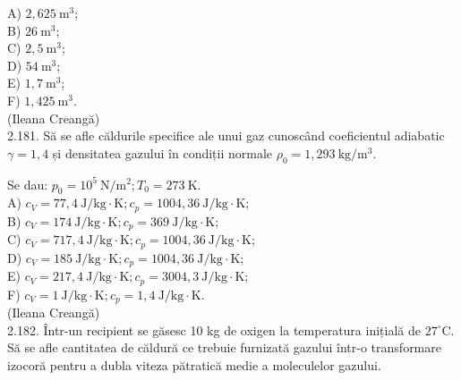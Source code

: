 \documentclass[10pt]{article}
\begin{document}
A) $2,625 \mathrm{~m}^{3}$;\\
B) $26 \mathrm{~m}^{3}$;\\
C) $2,5 \mathrm{~m}^{3}$;\\
D) $54 \mathrm{~m}^{3}$;\\
E) $1,7 \mathrm{~m}^{3}$;\\
F) $1,425 \mathrm{~m}^{3}$.\\
(Ileana Creangă)\\
2.181. Să se afle căldurile specifice ale unui gaz cunoscând coeficientul adiabatic $\gamma=1,4$ și densitatea gazului în condiții normale $\rho_{0}=1,293 \mathrm{~kg} / \mathrm{m}^{3}$.

Se dau: $p_{0}=10^{5} \mathrm{~N} / \mathrm{m}^{2} ; T_{0}=273 \mathrm{~K}$.\\
A) $c_{V}=77,4 \mathrm{~J} / \mathrm{kg} \cdot \mathrm{K} ; c_{p}=1004,36 \mathrm{~J} / \mathrm{kg} \cdot \mathrm{K}$;\\
B) $c_{V}=174 \mathrm{~J} / \mathrm{kg} \cdot \mathrm{K} ; c_{p}=369 \mathrm{~J} / \mathrm{kg} \cdot \mathrm{K}$;\\
C) $c_{V}=717,4 \mathrm{~J} / \mathrm{kg} \cdot \mathrm{K} ; c_{p}=1004,36 \mathrm{~J} / \mathrm{kg} \cdot \mathrm{K}$;\\
D) $c_{V}=185 \mathrm{~J} / \mathrm{kg} \cdot \mathrm{K} ; c_{p}=1004,36 \mathrm{~J} / \mathrm{kg} \cdot \mathrm{K}$;\\
E) $c_{V}=217,4 \mathrm{~J} / \mathrm{kg} \cdot \mathrm{K} ; c_{p}=3004,3 \mathrm{~J} / \mathrm{kg} \cdot \mathrm{K}$;\\
F) $c_{V}=1 \mathrm{~J} / \mathrm{kg} \cdot \mathrm{K} ; c_{p}=1,4 \mathrm{~J} / \mathrm{kg} \cdot \mathrm{K}$.\\
(Ileana Creangă)\\
2.182. Într-un recipient se găsesc 10 kg de oxigen la temperatura inițială de $27^{\circ} \mathrm{C}$. Să se afle cantitatea de căldură ce trebuie furnizată gazului într-o transformare izocoră pentru a dubla viteza pătratică medie a moleculelor gazului.
\end{document}
